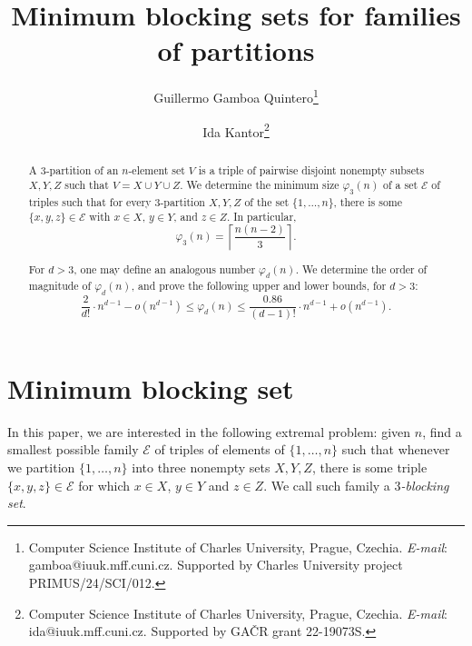 \documentclass[11pt,a4paper]{article}
\title{Minimum blocking sets for families of partitions}
\author{Guillermo Gamboa Quintero\thanks{Computer Science Institute of Charles University, Prague, Czechia. \textit{E-mail}: gamboa@iuuk.mff.cuni.cz. Supported by Charles University project PRIMUS/24/SCI/012.}
\and
Ida Kantor\thanks{Computer Science Institute of Charles University, Prague, Czechia. \textit{E-mail}: ida@iuuk.mff.cuni.cz. Supported by GAČR grant 22-19073S.}}
\date{}
\begin{document}
\maketitle


\newtheorem{theorem}{Theorem}
\newtheorem{definition}{Definition}
\newtheorem{corollary}{Corollary}
\newtheorem{lemma}{Lemma}
\newtheorem{observation}{Observation}

\begin{abstract}
    A $3$-partition of an $n$-element set $V$ is a triple of pairwise disjoint nonempty subsets $X,Y,Z$ such that $V=X\cup Y\cup Z$. We determine the minimum size $\varphi_3(n)$ of a set $\mathcal{E}$ of triples such that for every $3$-partition $X,Y,Z$ of the set $\{1,\dots,n\}$, there is some $\{x,y,z\}\in \mathcal{E}$ with $x\in X$, $y\in Y$, and $z\in Z$. In particular,
        \[\varphi_3(n)=\left\lceil \frac{n(n-2)}{3} \right\rceil.\]

    For $d>3$, one may define an analogous number $\varphi_d(n)$. We determine the order of magnitude of $\varphi_d(n)$, and prove the following upper and lower bounds, for $d>3$:
    \[\frac{2 }{d!}\cdot n^{d-1} -o(n^{d-1}) \leq \varphi_d(n) \leq \frac{0.86}{(d-1)!}\cdot n^{d-1}+o(n^{d-1}).\]
\end{abstract}



\section{Minimum blocking set}
In this paper, we are interested in the following extremal problem: given $n$, find a smallest possible family $\mathcal{E}$ of triples of elements of $\{1,\dots,n\}$ such that whenever we partition $\{1,\dots,n\}$ into three nonempty sets $X,Y,Z$, there is some triple $\{x,y,z\}\in \mathcal{E}$ for which $x\in X$, $y\in Y$ and $z\in Z$. We call such family a {\em $3$-blocking set}.
\end{document}
